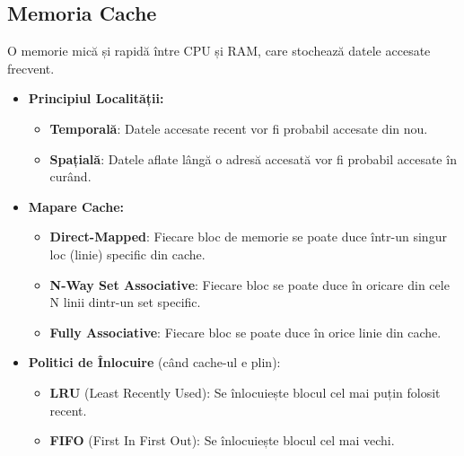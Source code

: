 \documentclass[12pt,a4paper]{article}
\begin{document}
\subsection{Memoria Cache}
O memorie mică și rapidă între CPU și RAM, care stochează datele accesate frecvent.
\begin{itemize}
    \item \textbf{Principiul Localității:}
        \begin{itemize}
            \item \textbf{Temporală}: Datele accesate recent vor fi probabil accesate din nou.
            \item \textbf{Spațială}: Datele aflate lângă o adresă accesată vor fi probabil accesate în curând.
        \end{itemize}
    \item \textbf{Mapare Cache:}
        \begin{itemize}
            \item \textbf{Direct-Mapped}: Fiecare bloc de memorie se poate duce într-un singur loc (linie) specific din cache.
            \item \textbf{N-Way Set Associative}: Fiecare bloc se poate duce în oricare din cele N linii dintr-un set specific.
            \item \textbf{Fully Associative}: Fiecare bloc se poate duce în orice linie din cache.
        \end{itemize}
    \item \textbf{Politici de Înlocuire} (când cache-ul e plin):
        \begin{itemize}
            \item \textbf{LRU} (Least Recently Used): Se înlocuiește blocul cel mai puțin folosit recent.
            \item \textbf{FIFO} (First In First Out): Se înlocuiește blocul cel mai vechi.
        \end{itemize}
\end{itemize}
\end{document}
